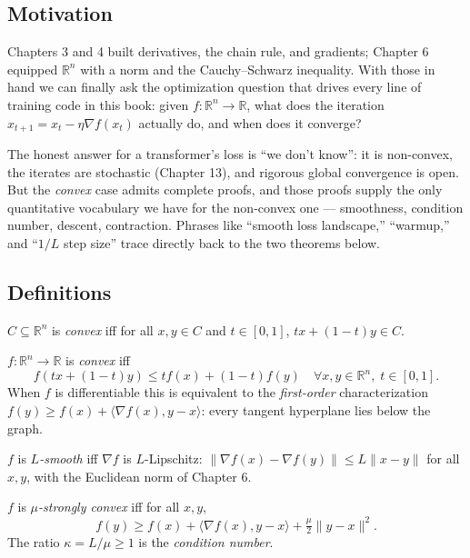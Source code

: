 \subsection*{Motivation}

Chapters 3 and 4 built derivatives, the chain rule, and gradients; Chapter 6 equipped $\mathbb{R}^n$ with a norm and the Cauchy--Schwarz inequality. With those in hand we can finally ask the optimization question that drives every line of training code in this book: given $f : \mathbb{R}^n \to \mathbb{R}$, what does the iteration $x_{t+1} = x_t - \eta \nabla f(x_t)$ actually do, and when does it converge?

The honest answer for a transformer's loss is ``we don't know'': it is non-convex, the iterates are stochastic (Chapter 13), and rigorous global convergence is open. But the \emph{convex} case admits complete proofs, and those proofs supply the only quantitative vocabulary we have for the non-convex one --- smoothness, condition number, descent, contraction. Phrases like ``smooth loss landscape,'' ``warmup,'' and ``$1/L$ step size'' trace directly back to the two theorems below.

\subsection*{Definitions}

\begin{definition}
$C \subseteq \mathbb{R}^n$ is \emph{convex} iff for all $x, y \in C$ and $t \in [0,1]$, $tx + (1-t)y \in C$.
\end{definition}

\begin{definition}
$f : \mathbb{R}^n \to \mathbb{R}$ is \emph{convex} iff
\[
f(tx + (1-t)y) \leq t f(x) + (1-t) f(y) \quad \forall x, y \in \mathbb{R}^n,\; t \in [0,1].
\]
When $f$ is differentiable this is equivalent to the \emph{first-order} characterization $f(y) \geq f(x) + \langle \nabla f(x), y - x \rangle$: every tangent hyperplane lies below the graph.
\end{definition}

\begin{definition}[$L$-smoothness]
$f$ is \emph{$L$-smooth} iff $\nabla f$ is $L$-Lipschitz: $\|\nabla f(x) - \nabla f(y)\| \leq L \|x - y\|$ for all $x, y$, with the Euclidean norm of Chapter 6.
\end{definition}

\begin{definition}
$f$ is \emph{$\mu$-strongly convex} iff for all $x, y$,
\[
f(y) \geq f(x) + \langle \nabla f(x), y - x \rangle + \tfrac{\mu}{2} \|y - x\|^2.
\]
The ratio $\kappa = L / \mu \geq 1$ is the \emph{condition number}.
\end{definition}

